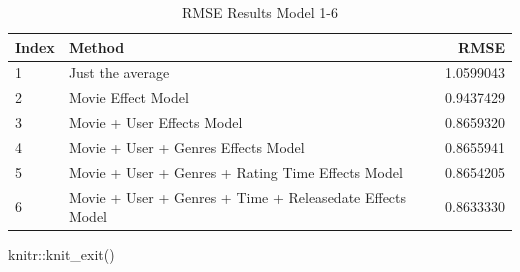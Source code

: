 \documentclass[
]{article}
\newenvironment{Shaded}{}{}
\newcommand{\FunctionTok}[1]{\textcolor[rgb]{0.02,0.16,0.49}{#1}}
\newcommand{\NormalTok}[1]{#1}
\newcommand{\SpecialCharTok}[1]{\textcolor[rgb]{0.25,0.44,0.63}{#1}}
\begin{document}
\begin{table}[H]

\caption{\label{tab:rde_5}RMSE Results Model 1-6\label{tbl:rmse_results_model_1-6}}
\centering
\fontsize{7}{9}\selectfont
\begin{tabular}[t]{llr}
\toprule
Index & Method & RMSE\\
\midrule
1 & Just the average & 1.0599043\\
2 & Movie Effect Model & 0.9437429\\
3 & Movie + User Effects Model & 0.8659320\\
4 & Movie + User + Genres Effects Model & 0.8655941\\
5 & Movie + User + Genres + Rating Time Effects Model & 0.8654205\\
6 & Movie + User + Genres + Time + Releasedate Effects Model & 0.8633330\\
\bottomrule
\end{tabular}
\end{table}

\begin{Shaded}
\begin{Highlighting}[]
\NormalTok{    knitr}\SpecialCharTok{::}\FunctionTok{knit\_exit}\NormalTok{()}
\end{Highlighting}
\end{Shaded}
\end{document}
